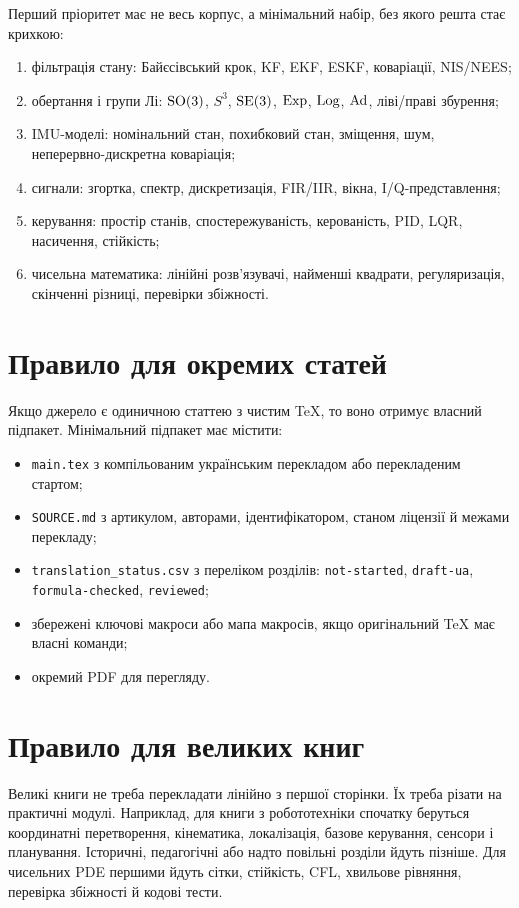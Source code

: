 Перший пріоритет має не весь корпус, а мінімальний набір, без якого решта стає крихкою:

\begin{enumerate}
\item фільтрація стану: Байєсівський крок, KF, EKF, ESKF, коваріації, NIS/NEES;
\item обертання і групи Лі: $\mathrm{SO}(3)$, $S^3$, $\mathrm{SE}(3)$, $\operatorname{Exp}$, $\operatorname{Log}$, $\operatorname{Ad}$, ліві/праві збурення;
\item IMU-моделі: номінальний стан, похибковий стан, зміщення, шум, неперервно-дискретна коваріація;
\item сигнали: згортка, спектр, дискретизація, FIR/IIR, вікна, I/Q-представлення;
\item керування: простір станів, спостережуваність, керованість, PID, LQR, насичення, стійкість;
\item чисельна математика: лінійні розв'язувачі, найменші квадрати, регуляризація, скінченні різниці, перевірки збіжності.
\end{enumerate}

\section{Правило для окремих статей}

Якщо джерело є одиничною статтею з чистим TeX, то воно отримує власний підпакет. Мінімальний підпакет має містити:

\begin{itemize}
\item \texttt{main.tex} з компільованим українським перекладом або перекладеним стартом;
\item \texttt{SOURCE.md} з артикулом, авторами, ідентифікатором, станом ліцензії й межами перекладу;
\item \texttt{translation\_status.csv} з переліком розділів: \texttt{not-started}, \texttt{draft-ua}, \texttt{formula-checked}, \texttt{reviewed};
\item збережені ключові макроси або мапа макросів, якщо оригінальний TeX має власні команди;
\item окремий PDF для перегляду.
\end{itemize}

\section{Правило для великих книг}

Великі книги не треба перекладати лінійно з першої сторінки. Їх треба різати на практичні модулі. Наприклад, для книги з робототехніки спочатку беруться координатні перетворення, кінематика, локалізація, базове керування, сенсори і планування. Історичні, педагогічні або надто повільні розділи йдуть пізніше. Для чисельних PDE першими йдуть сітки, стійкість, CFL, хвильове рівняння, перевірка збіжності й кодові тести.

